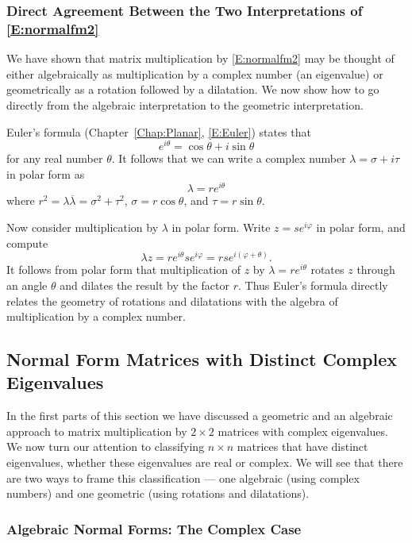 \documentclass{ximera}
\begin{document}
\subsubsection*{Direct Agreement Between the Two Interpretations of 
\protect\eqref{E:normalfm2}}   

We have shown that matrix multiplication by \eqref{E:normalfm2} may be thought 
of either algebraically as multiplication by a complex number (an eigenvalue)
or geometrically as a rotation followed by a dilatation.  We now show how to
go directly from the algebraic interpretation to the geometric interpretation.

Euler's formula (Chapter~\ref{Chap:Planar}, 
\eqref{E:Euler}) states that
\[
e^{i\theta} = \cos\theta + i\sin\theta
\]
for any real number $\theta$. It follows that we can write a 
complex number $\lambda=\sigma+i\tau$ in polar form as
\[
\lambda = re^{i\theta}
\]
where $r^2=\lambda\overline{\lambda}=\sigma^2+\tau^2$, $\sigma=r\cos\theta$,
and $\tau=r\sin\theta$.  

Now consider multiplication by $\lambda$ in polar form.  Write 
$z=se^{i\varphi}$ in polar form, and compute
\[
\lambda z = re^{i\theta}se^{i\varphi} = rse^{i(\varphi+\theta)}.
\]
It follows from polar form that multiplication of $z$ by 
$\lambda=re^{i\theta}$  rotates 
$z$ through an angle $\theta$ and dilates the result by the factor $r$.
Thus Euler's formula directly relates the geometry of 
rotations and 
dilatations with the 
algebra of multiplication by a complex number.


\subsection*{Normal Form Matrices with Distinct Complex Eigenvalues}

In the first parts of this section we have discussed a geometric and 
an algebraic approach to matrix multiplication by $2\times 2$ matrices with 
complex eigenvalues.   We now turn our attention to classifying $n\times n$ 
matrices that have distinct eigenvalues, whether these eigenvalues are real 
or complex.  We will see that there are two ways to frame this classification 
--- one algebraic (using complex numbers) and one geometric (using rotations 
and dilatations).

\subsubsection*{Algebraic Normal Forms: The Complex Case}
\end{document}
